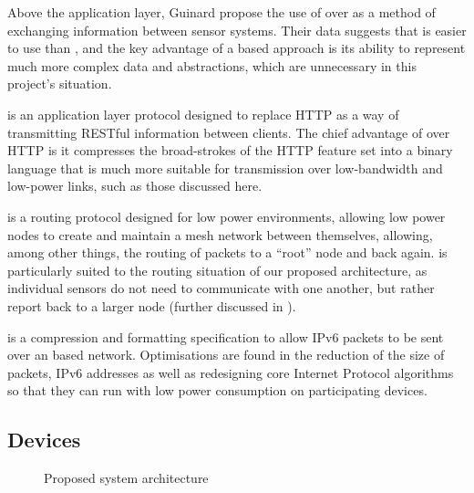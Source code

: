 \documentclass[../thesis/thesis.tex]{subfiles}
\begin{document}
Above the application layer, Guinard \etal \cite{guinard2012search} propose the use of \rest over \ws as a method of exchanging information between sensor systems. Their data suggests that \rest is easier to use than \ws, and the key advantage of a \ws based approach is its ability to represent much more complex data and abstractions, which are unnecessary in this project's situation.

\coap \cite{kovatsch2013coap} is an application layer protocol designed to replace HTTP as a way of transmitting RESTful information between clients. The chief advantage of \coap over HTTP is it compresses the broad-strokes of the HTTP feature set into a binary language that is much more suitable for transmission over low-bandwidth and low-power links, such as those discussed here.

\roll \cite{rfc6550} is a routing protocol designed for low power environments, allowing low power nodes to create and maintain a mesh network between themselves, allowing, among other things, the routing of packets to a ``root'' node and back again. \roll is particularly suited to the routing situation of our proposed architecture, as individual sensors do not need to communicate with one another, but rather report back to a larger node (further discussed in ).

\lowpan \cite{shelby20116lowpan} is a compression and formatting specification to allow IPv6 packets to be sent over an \lwifi based network. Optimisations are found in the reduction of the size of \lowpan packets, IPv6 addresses as well as redesigning core Internet Protocol algorithms so that they can run with low power consumption on participating devices.

\subsection{Devices}
\label{subsec:litreview:architecture:devices}
\begin{figure}
\centering
{}
\caption{Proposed system architecture}
\label{fig:litreview:devices}
\end{figure}
\end{document}
